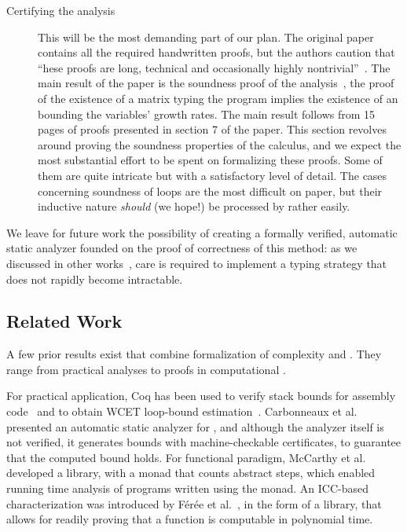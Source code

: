 \begin{description}
\item[Certifying the analysis]
This will be the most demanding part of our plan. The original paper contains
all the required handwritten proofs, but the authors caution that
\enquote{hese proofs are long, technical and occasionally highly
nontrivial}~\cite[p.~2]{jones2009}. The main result of the paper is the
soundness proof of the analysis~\cite[Theorem 5.3]{jones2009}, \ie the proof of the existence of a matrix
typing the program implies the existence of an  bounding
the variables' growth rates. The main result follows from 15 pages of proofs
presented in section 7 of the paper. This section revolves around proving the
soundness properties of the calculus, and we expect the most
substantial effort to be spent on formalizing these proofs. Some of them are
quite intricate but with a satisfactory level of detail. The cases concerning
soundness of loops are the most difficult on paper, but their inductive nature
\emph{should} (we hope!) be processed by  rather easily.

\end{description}

We leave for future work the possibility of creating a formally verified,
automatic static analyzer founded on the proof of correctness of this method: as
we discussed in other works~\cite{aubert2023b,aubert20222}, care is required to
implement a typing strategy that does not rapidly become intractable.

\subsection{Related Work}
\label{subsec:coqpl-related}

A few prior results exist that combine formalization of complexity and
. They range from practical analyses to proofs in computational
.

For practical application, Coq has been used to verify stack bounds for assembly
code~\cite{carbonneaux2014} and to obtain WCET
loop-bound estimation~\cite{blazy2013}. {Carbonneaux et
al.}~\cite{carbonneaux2017} presented an automatic static analyzer for
, and although the analyzer itself is not verified, it
generates bounds with machine-checkable certificates, to guarantee that the
computed bound holds. For functional paradigm, McCarthy et
al.~\cite{mccarthy2018} developed a  library, with a monad that counts
abstract steps, which enabled running time analysis of programs written using
the monad. An ICC-based characterization was introduced by Férée et
al.~\cite{feree2018}, in the form of a  library, that allows for
readily proving that a function is computable in polynomial time.

